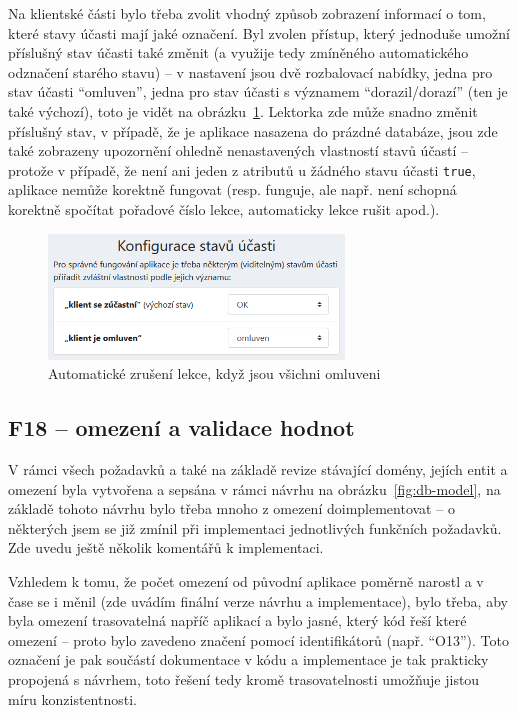 Na klientské části bylo třeba zvolit vhodný způsob zobrazení informací o tom, které stavy účasti mají jaké označení. Byl zvolen přístup, který jednoduše umožní příslušný stav účasti také změnit (a využije tedy zmíněného automatického odznačení starého stavu) -- v nastavení jsou dvě rozbalovací nabídky, jedna pro stav účasti \enquote{omluven}, jedna pro stav účasti s významem \enquote{dorazil/dorazí} (ten je také výchozí), toto je vidět na obrázku~\ref{fig:ui-screen-vlastnostistavu}. Lektorka zde může snadno změnit příslušný stav, v případě, že je aplikace nasazena do prázdné databáze, jsou zde také zobrazeny upozornění ohledně nenastavených vlastností stavů účastí -- protože v případě, že není ani jeden z atributů u žádného stavu účasti \verb|true|, aplikace nemůže korektně fungovat (resp. funguje, ale např. není schopná korektně spočítat pořadové číslo lekce, automaticky lekce rušit apod.).

\begin{figure}[h]\centering
    \includegraphics[width=0.7\textwidth]{img/ui-screen-vlastnostistavu.png}
    \caption{Automatické zrušení lekce, když jsou všichni omluveni}\label{fig:ui-screen-vlastnostistavu}
\end{figure}

\subsection{F18 -- omezení a validace hodnot}

V rámci všech požadavků a také na základě revize stávající domény, jejích entit a omezení byla vytvořena a sepsána v rámci návrhu na obrázku~\ref{fig:db-model}, na základě tohoto návrhu bylo třeba mnoho z omezení doimplementovat -- o některých jsem se již zmínil při implementaci jednotlivých funkčních požadavků. Zde uvedu ještě několik komentářů k implementaci.

Vzhledem k tomu, že počet omezení od původní aplikace poměrně narostl a v čase se i měnil (zde uvádím finální verze návrhu a implementace), bylo třeba, aby byla omezení trasovatelná napříč aplikací a bylo jasné, který kód řeší které omezení -- proto bylo zavedeno značení pomocí identifikátorů (např. \enquote{O13}). Toto označení je pak součástí dokumentace v kódu a implementace je tak prakticky propojená s návrhem, toto řešení tedy kromě trasovatelnosti umožňuje jistou míru konzistentnosti.

